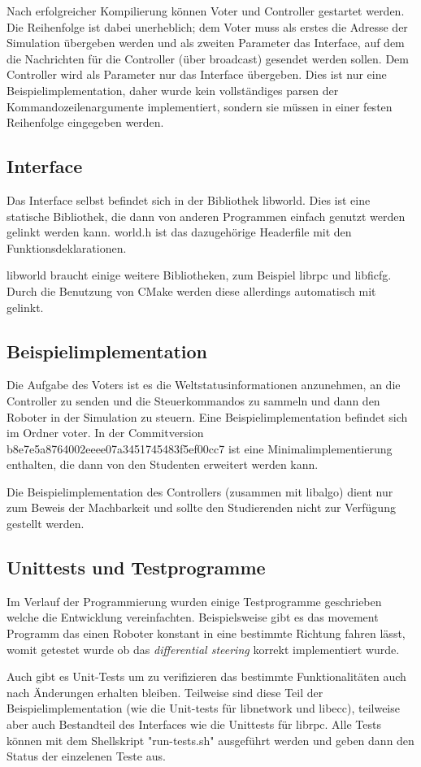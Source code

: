 \documentclass[
    12pt,
    bibliography=totoc,
    ngerman,
    enabledeprecatedfontcommands
]{scrartcl}
\begin{document}
Nach erfolgreicher Kompilierung k{\"{o}}nnen Voter und Controller gestartet werden. Die Reihenfolge ist dabei unerheblich; dem Voter muss als erstes die Adresse der Simulation
{\"{u}}bergeben werden und als zweiten Parameter das Interface, auf dem die Nachrichten f{\"{u}}r die Controller ({\"{u}}ber broadcast) gesendet werden sollen. Dem Controller
wird als Parameter nur das Interface {\"{u}}bergeben. Dies ist nur eine Beispielimplementation, daher wurde kein vollst{\"{a}}ndiges parsen der Kommandozeilenargumente
implementiert, sondern sie m{\"{u}}ssen in einer festen Reihenfolge eingegeben werden.

\subsection{Interface}
Das Interface selbst befindet sich in der Bibliothek libworld. Dies ist eine statische Bibliothek, die dann von anderen Programmen einfach genutzt werden
gelinkt werden kann. world.h ist das dazugeh{\"{o}}rige Headerfile mit den Funktionsdeklarationen.

libworld braucht einige weitere Bibliotheken, zum Beispiel librpc und libficfg. Durch die Benutzung von CMake werden diese allerdings automatisch mit gelinkt.

\subsection{Beispielimplementation}
Die Aufgabe des Voters ist es die Weltstatusinformationen anzunehmen, an die Controller zu senden und die Steuerkommandos zu sammeln und dann den Roboter in
der Simulation zu steuern. Eine Beispielimplementation befindet sich im Ordner voter. In der Commitversion b8e7e5a8764002eeee07a3451745483f5ef00cc7 ist eine
Minimalimplementierung enthalten, die dann von den Studenten erweitert werden kann.

Die Beispielimplementation des Controllers (zusammen mit libalgo) dient nur zum Beweis der Machbarkeit und sollte den Studierenden nicht zur Verf{\"{u}}gung
gestellt werden.

\subsection{Unittests und Testprogramme}
Im Verlauf der Programmierung wurden einige Testprogramme geschrieben welche die Entwicklung vereinfachten. Beispielsweise gibt es das movement Programm das
einen Roboter konstant in eine bestimmte Richtung fahren l{\"{a}}sst, womit getestet wurde ob das \textit{differential steering} korrekt implementiert wurde.

Auch gibt es Unit-Tests um zu verifizieren das bestimmte Funktionalit{\"{a}}ten auch nach {\"{A}}nderungen erhalten bleiben. Teilweise sind diese Teil der
Beispielimplementation (wie die Unit-tests f{\"{u}}r libnetwork und libecc), teilweise aber auch Bestandteil des Interfaces wie die Unittests f{\"{u}}r librpc.
Alle Tests k{\"{o}}nnen mit dem Shellskript "run-tests.sh" ausgef{\"{u}}hrt werden und geben dann den Status der einzelenen Teste aus.
\end{document}
